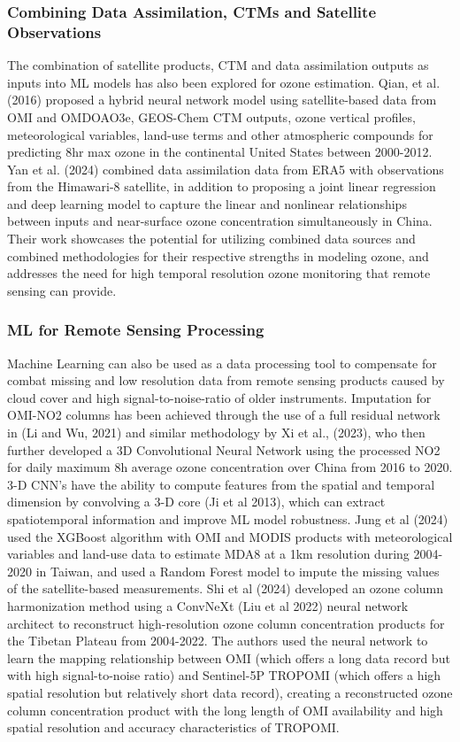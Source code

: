 \documentclass[gmd, manuscript]{copernicus}
\begin{document}
\subsubsection{Combining Data Assimilation, CTMs and Satellite Observations}
The combination of satellite products, CTM and data assimilation outputs as inputs into ML models has also been explored for ozone estimation. Qian, et al. (2016) proposed a hybrid neural network model using satellite-based data from OMI and OMDOAO3e, GEOS-Chem CTM outputs, ozone vertical profiles, meteorological variables, land-use terms and other atmospheric compounds for predicting 8hr max ozone in the continental United States between 2000-2012. Yan et al. (2024) combined data assimilation data from ERA5 with observations from the Himawari-8 satellite, in addition to proposing a joint linear regression and deep learning model to capture the linear and nonlinear relationships between inputs and near-surface ozone concentration simultaneously in China. Their work showcases the potential for utilizing combined data sources and combined methodologies for their respective strengths in modeling ozone, and addresses the need for high temporal resolution ozone monitoring that remote sensing can provide.
\subsubsection{ML for Remote Sensing Processing}
Machine Learning can also be used as a data processing tool to compensate for combat missing and low resolution data from remote sensing products caused by cloud cover and high signal-to-noise-ratio of older instruments. Imputation for OMI-NO2 columns has been achieved through the use of a full residual network in (Li and Wu, 2021) and similar methodology by Xi et al., (2023), who then further developed a 3D Convolutional Neural Network using the processed NO2 for daily maximum 8h average ozone concentration over China from 2016 to 2020. 3-D CNN’s have the ability to compute features from the spatial and temporal dimension by convolving a 3-D core (Ji et al 2013), which can extract spatiotemporal information and improve ML model robustness. Jung et al (2024) used the XGBoost algorithm with OMI and MODIS products with meteorological variables and land-use data to estimate MDA8 at a 1km resolution during 2004-2020 in Taiwan, and used a Random Forest model to impute the missing values of the satellite-based measurements. Shi et al (2024) developed an ozone column harmonization method using a ConvNeXt (Liu et al 2022) neural network architect to reconstruct high-resolution ozone column concentration products for the Tibetan Plateau from 2004-2022. The authors used the neural network to learn the mapping relationship between OMI (which offers a long data record but with high signal-to-noise ratio) and Sentinel-5P TROPOMI (which offers a high spatial resolution but relatively short data record), creating a reconstructed ozone column concentration product with the long length of OMI availability and high spatial resolution and accuracy characteristics of TROPOMI. 
\end{document}
